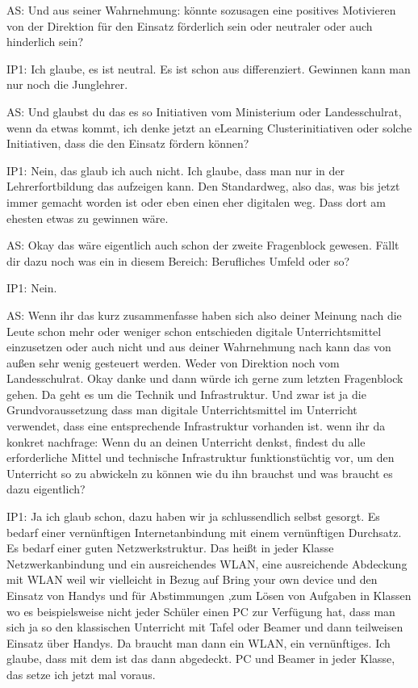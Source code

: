 \documentclass[fontsize=11pt,paper=a4]{scrbook}
\begin{document}
{\begin{itemize*}
\item[AS:] Und aus seiner Wahrnehmung: könnte sozusagen eine positives Motivieren von der Direktion für den Einsatz förderlich sein oder neutraler oder auch hinderlich sein?
\item[IP1:] Ich glaube, es ist neutral. Es ist schon aus differenziert. Gewinnen kann man nur noch die Junglehrer.
\item[AS:] Und glaubst du das es so Initiativen vom Ministerium oder Landesschulrat, wenn da etwas kommt, ich denke jetzt an eLearning Clusterinitiativen oder solche Initiativen, dass die den Einsatz fördern können?
\item[IP1:] Nein, das glaub ich auch nicht. Ich glaube, dass man nur in der Lehrerfortbildung das aufzeigen kann. Den Standardweg, also das, was bis jetzt immer gemacht worden ist oder eben einen eher digitalen weg. Dass dort am ehesten etwas zu gewinnen wäre.
\item[AS:] Okay das wäre eigentlich auch schon der zweite Fragenblock gewesen. Fällt dir dazu noch was ein in diesem Bereich: Berufliches 
Umfeld oder so?
\item[IP1:] Nein.
\item[AS:] Wenn ihr das kurz zusammenfasse haben sich also deiner Meinung nach die Leute schon mehr oder weniger schon entschieden digitale Unterrichtsmittel einzusetzen oder auch nicht und aus deiner Wahrnehmung nach kann das von außen sehr wenig gesteuert werden. Weder von Direktion noch vom Landesschulrat. Okay danke und dann würde ich gerne zum letzten Fragenblock gehen. Da geht es um die Technik und  Infrastruktur. Und zwar ist ja die Grundvoraussetzung dass man digitale Unterrichtsmittel im Unterricht verwendet, dass eine  entsprechende Infrastruktur vorhanden ist. wenn ihr da konkret nachfrage: Wenn du an deinen Unterricht denkst, findest du alle erforderliche Mittel und technische Infrastruktur funktionstüchtig vor, um den Unterricht so zu abwickeln zu können wie du ihn brauchst und was braucht es dazu eigentlich?
\item[IP1:] Ja ich glaub schon, dazu haben wir ja schlussendlich selbst gesorgt. Es bedarf einer vernünftigen Internetanbindung mit einem vernünftigen Durchsatz. Es bedarf einer guten Netzwerkstruktur. Das heißt in jeder Klasse Netzwerkanbindung und ein ausreichendes WLAN, eine ausreichende Abdeckung mit WLAN weil wir vielleicht in Bezug auf Bring your own device und den Einsatz von Handys und für Abstimmungen ,zum Lösen von Aufgaben in Klassen wo es beispielsweise nicht jeder Schüler einen PC zur Verfügung hat, dass man sich ja so den klassischen Unterricht mit Tafel oder Beamer und dann teilweisen Einsatz über Handys. Da braucht man dann ein WLAN, ein vernünftiges. Ich glaube, dass mit dem ist das dann abgedeckt. PC und Beamer in jeder Klasse, das setze ich jetzt mal voraus.

\end{itemize*}}
\end{document}
